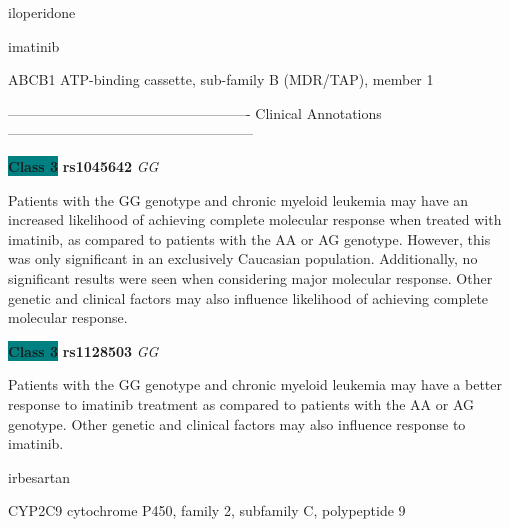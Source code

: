 \documentclass{resume} %
\begin{document}
\begin{rSection}{ iloperidone }
\end{rSection}\begin{rSection}{ imatinib }
\item[]

\begin{rSubsection}{ ABCB1 }{ ATP-binding cassette, sub-family B (MDR/TAP), member 1 }{}{}
\item[]

\item[] ---------------------------------------------------- Clinical Annotations -----------------------------------------------------\newline
\item \textbf{\colorbox{teal} {Class 3}} \textbf{ rs1045642 } \textit{ GG }
\item[] Patients with the GG genotype and chronic myeloid leukemia may have an increased likelihood of achieving complete molecular response when treated with imatinib, as compared to patients with the AA or AG genotype. However, this was only significant in an exclusively Caucasian population. Additionally, no significant results were seen when considering major molecular response. Other genetic and clinical factors may also influence likelihood of achieving complete molecular response.\item \textbf{\colorbox{teal} {Class 3}} \textbf{ rs1128503 } \textit{ GG }
\item[] Patients with the GG genotype and chronic myeloid leukemia may have a better response to imatinib treatment as compared to patients with the AA or AG genotype. Other genetic and clinical factors may also influence response to imatinib. 
\end{rSubsection}

\end{rSection}\begin{rSection}{ irbesartan }
\item[]

\begin{rSubsection}{ CYP2C9 }{ cytochrome P450, family 2, subfamily C, polypeptide 9 }{}{}
\item[]


\end{rSubsection}
\end{rSection}
\end{document}
